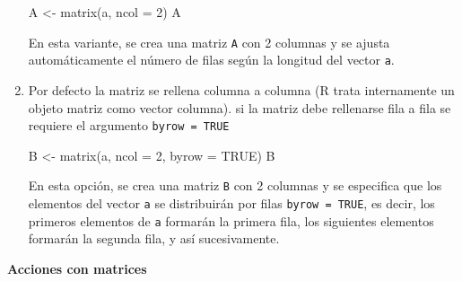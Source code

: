 \documentclass[
  letterpaper,
  DIV=11,
  numbers=noendperiod]{scrartcl}
\newenvironment{Shaded}{}{}
\newcommand{\AttributeTok}[1]{\textcolor[rgb]{0.84,0.23,0.29}{#1}}
\newcommand{\ConstantTok}[1]{\textcolor[rgb]{0.00,0.36,0.77}{#1}}
\newcommand{\DecValTok}[1]{\textcolor[rgb]{0.00,0.36,0.77}{#1}}
\newcommand{\FunctionTok}[1]{\textcolor[rgb]{0.44,0.26,0.76}{#1}}
\newcommand{\NormalTok}[1]{\textcolor[rgb]{0.14,0.16,0.18}{#1}}
\newcommand{\OtherTok}[1]{\textcolor[rgb]{0.44,0.26,0.76}{#1}}
\begin{document}
\begin{enumerate}
\begin{Shaded}
\begin{Highlighting}[]
\NormalTok{A }\OtherTok{\textless{}{-}} \FunctionTok{matrix}\NormalTok{(a, }\AttributeTok{ncol =} \DecValTok{2}\NormalTok{)}
\NormalTok{A}
\end{Highlighting}
\end{Shaded}

  En esta variante, se crea una matriz \texttt{A} con 2 columnas y se
  ajusta automáticamente el número de filas según la longitud del vector
  \texttt{a}.
\item
  Por defecto la matriz se rellena columna a columna (R trata
  internamente un objeto matriz como vector columna). si la matriz debe
  rellenarse fila a fila se requiere el argumento
  \texttt{byrow\ =\ TRUE}

\begin{Shaded}
\begin{Highlighting}[]
\NormalTok{B }\OtherTok{\textless{}{-}} \FunctionTok{matrix}\NormalTok{(a, }\AttributeTok{ncol =} \DecValTok{2}\NormalTok{, }\AttributeTok{byrow =} \ConstantTok{TRUE}\NormalTok{)}
\NormalTok{B}
\end{Highlighting}
\end{Shaded}

  En esta opción, se crea una matriz \texttt{B} con 2 columnas y se
  especifica que los elementos del vector \texttt{a} se distribuirán por
  filas \texttt{byrow\ =\ TRUE}, es decir, los primeros elementos de
  \texttt{a} formarán la primera fila, los siguientes elementos formarán
  la segunda fila, y así sucesivamente.
\end{enumerate}

\textbf{Acciones con matrices}
\end{document}
